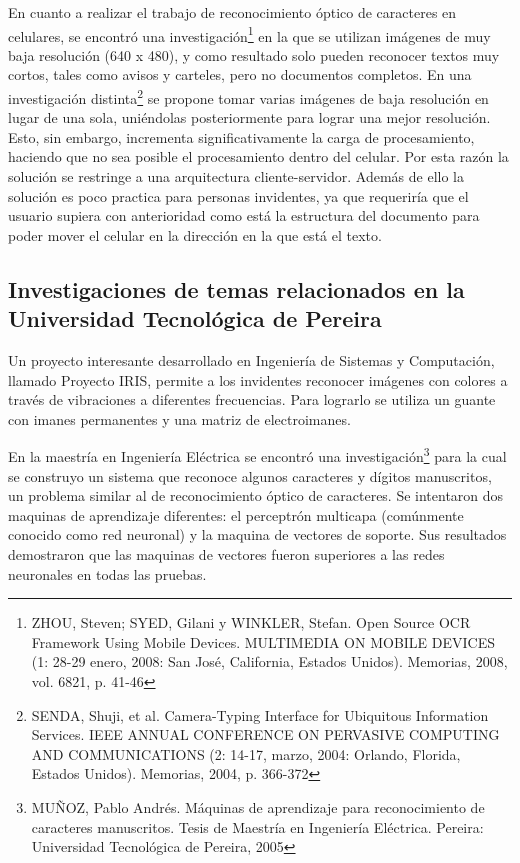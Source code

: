 \documentclass[a4paper, 11pt, oneside]{report}
\begin{document}
En cuanto a realizar el trabajo de reconocimiento óptico de caracteres en celulares, se encontró una investigación\footnote{ZHOU, Steven; SYED, Gilani y WINKLER, Stefan. Open Source OCR Framework Using Mobile Devices. MULTIMEDIA ON MOBILE DEVICES (1: 28-29 enero, 2008: San José, California, Estados Unidos). Memorias, 2008, vol. 6821, p. 41-46} en la que se utilizan imágenes de muy baja resolución (640 x 480), y como resultado solo pueden reconocer textos muy cortos, tales como avisos y carteles, pero no documentos completos. En una investigación distinta\footnote{SENDA, Shuji, et al. Camera-Typing Interface for Ubiquitous Information Services. IEEE ANNUAL CONFERENCE ON PERVASIVE COMPUTING AND COMMUNICATIONS (2: 14-17, marzo, 2004: Orlando, Florida, Estados Unidos). Memorias, 2004, p. 366-372} se propone tomar varias imágenes de baja resolución en lugar de una sola, uniéndolas posteriormente para lograr una mejor resolución. Esto, sin embargo, incrementa significativamente la carga de procesamiento, haciendo que no sea posible el procesamiento dentro del celular. Por esta razón la solución se restringe a una arquitectura cliente-servidor. Además de ello la solución es poco practica para personas invidentes, ya que requeriría que el usuario supiera con anterioridad como está la estructura del documento para poder mover el celular en la dirección en la que está el texto.
	
\subsection{Investigaciones de temas relacionados en la Universidad Tecnológica de Pereira}

Un proyecto interesante desarrollado en Ingeniería de Sistemas y Computación, llamado Proyecto IRIS, permite a los invidentes reconocer imágenes con colores a través de vibraciones a diferentes frecuencias. Para lograrlo se utiliza un guante con imanes permanentes y una matriz de electroimanes.

En la maestría en Ingeniería Eléctrica se encontró una investigación\footnote{MUÑOZ, Pablo Andrés. Máquinas de aprendizaje para reconocimiento de caracteres manuscritos. Tesis de Maestría en Ingeniería Eléctrica. Pereira: Universidad Tecnológica de Pereira, 2005} para la cual se construyo un sistema que reconoce algunos caracteres y dígitos manuscritos, un problema similar al de reconocimiento óptico de caracteres. Se intentaron dos maquinas de aprendizaje diferentes: el perceptrón multicapa (comúnmente conocido como red neuronal) y la maquina de vectores de soporte. Sus resultados demostraron que las maquinas de vectores fueron superiores a las redes neuronales en todas las pruebas.
    
\end{document}
